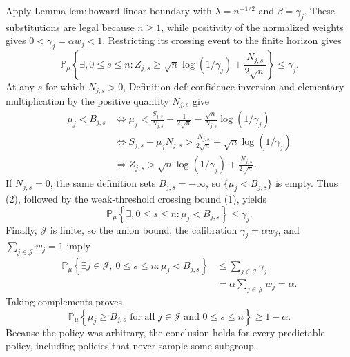 Apply Lemma \(\mathrm{lem{:}howard\mbox{-}linear\mbox{-}boundary}\) with \(\lambda=n^{-1/2}\) and \(\beta=\gamma_j\).  These substitutions are legal because \(n\geq1\), while positivity of the normalized weights gives \(0<\gamma_j=\alpha w_j<1\).  Restricting its crossing event to the finite horizon gives
\[
\mathbb P_\mu\!\left\{\exists,0\leq s\leq n:
Z_{j,s}\geq \sqrt n\log(1/\gamma_j)+\frac{N_{j,s}}{2\sqrt n}\right\}
\leq\gamma_j.
\tag{1}
\]
At any \(s\) for which \(N_{j,s}>0\), Definition \(\mathrm{def{:}confidence\mbox{-}inversion}\) and elementary multiplication by the positive quantity \(N_{j,s}\) give
\[
\begin{aligned}
\mu_j<B_{j,s}
&\iff
\mu_j<\frac{S_{j,s}}{N_{j,s}}-\frac{1}{2\sqrt n}
-\frac{\sqrt n}{N_{j,s}}\log(1/\gamma_j)\\
&\iff
S_{j,s}-\mu_jN_{j,s}>
\frac{N_{j,s}}{2\sqrt n}+\sqrt n\log(1/\gamma_j)\\
&\iff
Z_{j,s}>
\sqrt n\log(1/\gamma_j)+\frac{N_{j,s}}{2\sqrt n}.
\end{aligned}
\tag{2}
\]
If \(N_{j,s}=0\), the same definition sets \(B_{j,s}=-\infty\), so \(\{\mu_j<B_{j,s}\}\) is empty.  Thus (2), followed by the weak-threshold crossing bound (1), yields
\[
\mathbb P_\mu\!\left\{\exists,0\leq s\leq n:\mu_j<B_{j,s}\right\}\leq\gamma_j.
\tag{3}
\]
Finally, \(\mathcal J\) is finite, so the union bound, the calibration \(\gamma_j=\alpha w_j\), and \(\sum_{j\in\mathcal J}w_j=1\) imply
\[
\begin{aligned}
\mathbb P_\mu\!\left\{\exists j\in\mathcal J,\ 0\leq s\leq n:
\mu_j<B_{j,s}\right\}
&\leq\sum_{j\in\mathcal J}\gamma_j\\
&=\alpha\sum_{j\in\mathcal J}w_j
=\alpha.
\end{aligned}
\]
Taking complements proves
\[
\mathbb P_\mu\!\left\{\mu_j\geq B_{j,s}
\text{ for all }j\in\mathcal J\text{ and }0\leq s\leq n\right\}
\geq1-\alpha.
\]
Because the policy was arbitrary, the conclusion holds for every predictable policy, including policies that never sample some subgroup.
